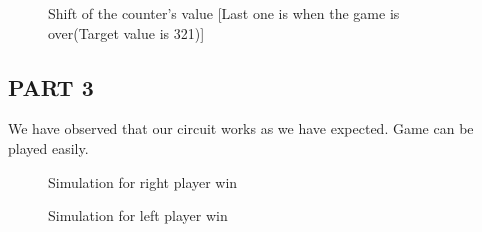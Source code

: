 \documentclass[pdftex,12pt,a4paper]{article}
\begin{document}
\begin{flushleft}
\begin{figure}[H]
    \centering
    \centering
    \caption{Shift of the counter's value [Last one is when the game is over(Target value is 321)]}
    \label{fig:part2-right-simulation}
\end{figure}
\end{flushleft}

\newpage{}
\begin{flushleft}
\subsection{PART 3}
We have observed that our circuit works as we have expected. Game can be played easily.
\begin{figure}[H]
    \centering
    \centering
    \caption{Simulation for right player win}
    \label{fig:right player win simulation}
\end{figure}
\begin{figure}[H]
    \centering
    \centering
    \caption{Simulation for left player win}
    \label{fig:left player win simulation}
\end{figure}
\end{flushleft}
\end{document}
